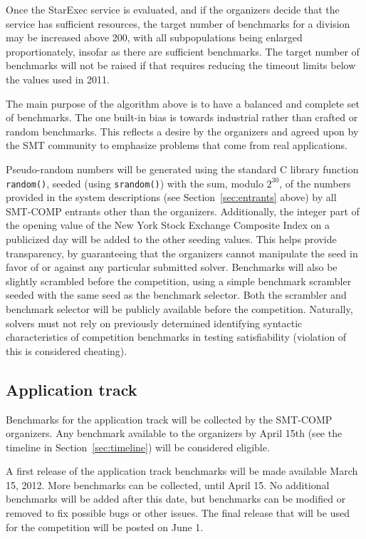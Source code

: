 \documentclass[12pt]{article}
\begin{document}
Once the StarExec service is evaluated, and if the organizers decide that
the service has sufficient resources, the target number of benchmarks for 
a division may be increased above 200, with all subpopulations being enlarged
proportionately, insofar as there are sufficient benchmarks. The target number
of benchmarks will not be raised if that requires reducing the timeout limits
below the values used in 2011.

The main purpose of the algorithm above is to have a balanced and complete set
of benchmarks.  The one built-in bias is towards industrial rather than crafted
or random benchmarks.  This reflects a desire by the organizers and agreed upon
by the SMT community to emphasize problems that come from real applications.

Pseudo-random numbers will be generated using the standard C library
function \texttt{random()}, seeded (using \texttt{srandom()}) with the
sum, modulo $2^{30}$, of the numbers provided in the system
descriptions (see Section~\ref{sec:entrants} above) by all SMT-COMP
entrants other than the organizers.  Additionally, the integer part of
the opening value of the New York Stock Exchange Composite Index on
a publicized day
will be added to the other seeding values.  This helps provide transparency,
by guaranteeing that the organizers cannot manipulate the seed in
favor of or against any particular submitted solver.  Benchmarks will also be slightly
scrambled before the competition, using a simple benchmark scrambler
seeded with the same seed as the benchmark selector.  Both the
scrambler and benchmark selector will be publicly available before the
competition.  Naturally, solvers must not rely on previously
determined identifying syntactic characteristics of competition
benchmarks in testing satisfiability (violation of this is considered
cheating).

\subsection{Application track}

Benchmarks for the application track will be collected by the SMT-COMP organizers.
Any benchmark available to the organizers by April 15th (see the timeline in
Section~\ref{sec:timeline}) will be considered eligible.

A first release of the application track
benchmarks will be made available March 15, 2012.
More benchmarks can be collected, until April 15.
No additional
benchmarks will be added after this date, but benchmarks can be
modified or removed to fix possible bugs or other issues. 
The final release that will be used for the competition will be posted on 
June 1.
\end{document}
